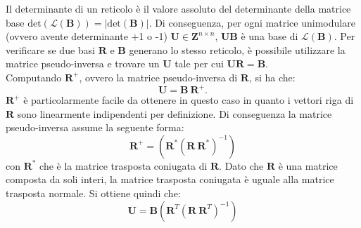 Il determinante di un reticolo è il valore assoluto del 
determinante della matrice base 
$\text{det}(\mathcal{L}(\mathbf{B})) = |\text{det}(\mathbf{B})|$. 
Di conseguenza, per ogni matrice unimodulare (ovvero avente determinante +1 o -1) 
$\mathbf{U} \in \mathbf{Z}^{n \times n}$, $\mathbf{U}\mathbf{B}$ è una base di 
$\mathcal{L}(\mathbf{B})$. Per verificare se due basi $\mathbf{R}$ e $\mathbf{B}$ generano
lo stesso reticolo, è possibile utilizzare la matrice pseudo-inversa e trovare un $\mathbf{U}$
tale per cui $\mathbf{U}\mathbf{R} = \mathbf{B}$.
\\
Computando $\mathbf{R}^+$, ovvero la matrice pseudo-inversa di $\mathbf{R}$, si ha che:
\[
    \mathbf{U} = \mathbf{B} \ \mathbf{R}^+.
\]
$\mathbf{R}^+$ è particolarmente facile da ottenere in questo caso in quanto i vettori
riga di $\mathbf{R}$ sono linearmente indipendenti per definizione. Di conseguenza la
matrice pseudo-inversa assume la seguente forma:
\[
    \mathbf{R}^+ = (\mathbf{R}^* (\mathbf{R} \ \mathbf{R}^*)^{-1})
\]
con $\mathbf{R}^*$ che è la matrice trasposta coniugata di $\mathbf{R}$. Dato che $\mathbf{R}$
è una matrice composta da soli interi, la matrice trasposta coniugata è uguale alla matrice
trasposta normale. Si ottiene quindi che:
\[
    \mathbf{U} = \mathbf{B}(\mathbf{R}^T (\mathbf{R} \ \mathbf{R}^T)^{-1})
\]
